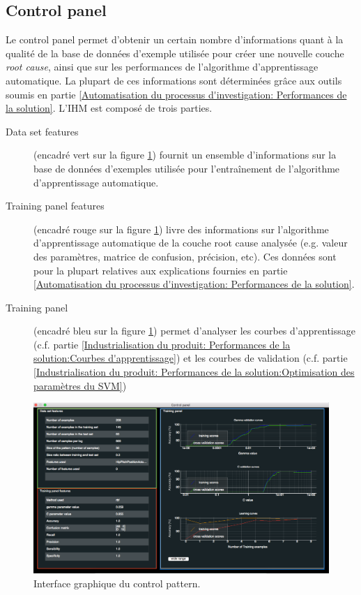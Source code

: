 \subsection{Control panel}
\label{Industrialisation du produit: Outils graphiques: Control panel}
Le control panel permet d'obtenir un certain nombre d'informations quant à la qualité de la base de données d'exemple utilisée pour créer une nouvelle couche \emph{root cause}, ainsi que sur les performances de l'algorithme d'apprentissage automatique. La plupart de ces informations sont déterminées grâce aux outils soumis en partie \ref{Automatisation du processus d'investigation: Performances de la solution}. L'IHM est composé de trois parties.
\begin{description}
	\item [Data set features] (encadré vert sur la figure \ref{fig:Interface graphique du control pattern}) fournit un ensemble d'informations sur la base de données d'exemples utilisée pour l'entraînement de l'algorithme d'apprentissage automatique. 
	\item [Training panel features ](encadré rouge sur la figure \ref{fig:Interface graphique du control pattern})  livre des informations sur l'algorithme d'apprentissage automatique de la couche root cause analysée (e.g. valeur des paramètres, matrice de confusion, précision, etc). Ces données sont pour la plupart relatives aux explications fournies en partie \ref{Automatisation du processus d'investigation: Performances de la solution}.
	\item [Training panel ](encadré bleu sur la figure \ref{fig:Interface graphique du control pattern}) permet d'analyser les courbes d'apprentissage (c.f. partie \ref{Industrialisation du produit: Performances de la solution:Courbes d'apprentissage}) et les courbes de validation (c.f. partie \ref{Industrialisation du produit: Performances de la solution:Optimisation des paramètres du SVM})
\end{description}

\begin{figure}[h]
	\centering\includegraphics[width=15cm]{images/control_panel.png}
	\caption[Interface graphique du control pattern]{Interface graphique du control pattern.}
	\label{fig:Interface graphique du control pattern}
\end{figure}

